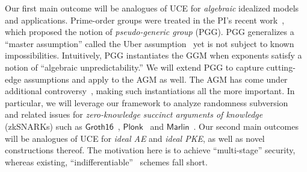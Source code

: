  Our first main outcome will be analogues of UCE for \emph{algebraic} idealized models and applications. Prime-order groups were treated  in the PI's recent work~\cite{TCC:BFHO22}, which proposed the notion of \emph{pseudo-generic group} (PGG).  PGG  generalizes  a ``master assumption'' called the Uber assumption~\cite{EC:BonBoyGoh05,PAIRING:Boyen08} yet is  not subject to known impossibilities. Intuitively, PGG  instantiates the GGM when exponents satisfy a notion of  ``algebraic unpredictability.'' 
We will extend PGG to capture  cutting-edge assumptions and apply to the AGM as well. The AGM has come under additional controversy~\cite{AC:ZhaZhoKat22,C:Zhandry22b}, making such instantiations all the more important. In particular, we will leverage our framework to analyze randomness subversion~\cite{AC:BelFucSca16} and related issues for  \emph{zero-knowledge succinct arguments of knowledge} (zkSNARKs) such as $\mathsf{Groth16}$~\cite{EC:Groth16}, $\mathsf{Plonk}$~\cite{EPRINT:GabWilCio19} and $\mathsf{Marlin}$~\cite{EC:CHMMVW20}.   %
Our second main outcomes will be analogues of UCE for \emph{ideal AE} and \emph{ideal PKE}, as well as novel constructions thereof. The motivation here is to achieve  ``multi-stage'' security, whereas existing, ``indifferentiable''~\cite{TCC:MauRenHol04} schemes fall short. %
